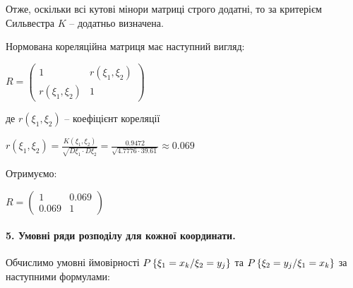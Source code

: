 \documentclass[a4paper, 20pt, titlepage]{article}
\begin{document}
\begin{spacing}{1.4}
\begin{enumerate}
Отже, оскільки всі кутові мінори матриці строго додатні, то за критерієм Сильвестра $K$ -- додатньо визначена.

\newpage{}


Нормована кореляційна матриця має наступний вигляд:

\begin{center}
$
R =
\begin{pmatrix}
1 & r(\xi_1,\xi_2) \\
r(\xi_1,\xi_2) & 1
\end{pmatrix}
$
\end{center}
де $r(\xi_1,\xi_2) $ --  коефіцієнт кореляції

\vspace{3mm}

$\displaystyle{r(\xi_1,\xi_2) = \frac{K(\xi_1,\xi_2)}{\sqrt{D \xi_1 \cdot D \xi_2 }}} = \frac{0.9472}{\sqrt{4.7776 \cdot 39.61}} \approx 0.069$

\vspace{3mm}
Отримуємо:
\begin{center}
$
R =
\begin{pmatrix}
1 & 0.069 \\
0.069 & 1
\end{pmatrix}
$
\end{center}
\end{enumerate}
\end{spacing}


\paragraph{5. Умовні ряди розподілу для кожної координати.}
\hfill \break

Обчислимо умовні ймовірності $P\left\{\xi_1 = x_k / \xi_2 = y_j \right\}$ та $P\left\{\xi_2 = y_j / \xi_1 = x_k \right\}$ за наступними формулами:
\end{document}
